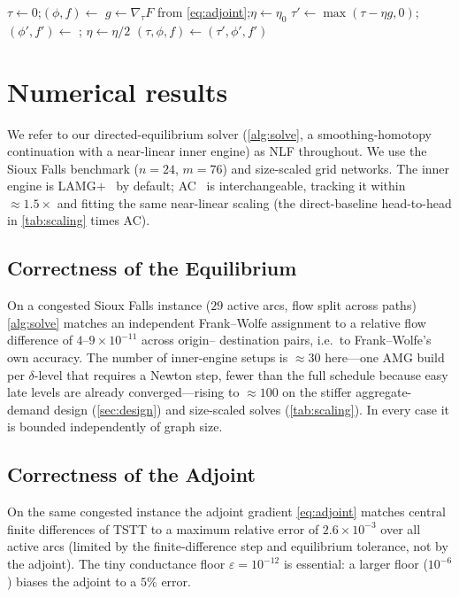 \documentclass[ijoc]{informs3}
\begin{document}
\begin{algorithm}
\caption{Bilevel toll design}\label{alg:design}
\begin{algorithmic}[1]
\State $\tau\gets0$;\quad $(\phi,f)\gets$  
  \State $g\gets\nabla_\tau F$ from \cref{eq:adjoint};\quad $\eta\gets\eta_0$
  \Repeat {}
    \State $\tau'\gets\max(\tau-\eta g,0)$; $(\phi',f')\gets$ ; $\eta\gets\eta/2$
  \State $(\tau,\phi,f)\gets(\tau',\phi',f')$
\EndFor
\end{algorithmic}
\end{algorithm}

\section{Numerical results}\label{sec:results}
We refer to our directed-equilibrium solver (\cref{alg:solve}, a smoothing-homotopy continuation with a near-linear inner engine) as NLF throughout.
We use the Sioux Falls benchmark ($n=24$, $m=76$) and size-scaled grid networks. The inner engine is
LAMG$+$~\citep{lamgplus} by default; AC~\citep{kyngsachdeva2016} is interchangeable, tracking it within
${\approx}1.5\times$ and fitting the same near-linear scaling (the direct-baseline head-to-head in
\cref{tab:scaling} times AC).

\subsection{Correctness of the Equilibrium}
On a congested Sioux Falls instance ($29$ active arcs, flow split across paths) \cref{alg:solve} matches an
independent Frank--Wolfe assignment to a relative flow difference of $4$--$9\times10^{-11}$ across origin--
destination pairs, i.e.\ to Frank--Wolfe's own accuracy. The number of inner-engine setups is ${\approx}30$
here---one AMG build per $\delta$-level that requires a Newton step, fewer than the full schedule because easy
late levels are already converged---rising to ${\approx}100$ on the stiffer aggregate-demand design (\cref{sec:design})
and size-scaled solves (\cref{tab:scaling}). In every case it is bounded independently of graph size.

\subsection{Correctness of the Adjoint}
On the same congested instance the adjoint gradient \cref{eq:adjoint} matches central finite differences of TSTT
to a maximum relative error of $2.6\times10^{-3}$ over all active arcs (limited by the finite-difference step and
equilibrium tolerance, not by the adjoint). The tiny conductance floor $\varepsilon=10^{-12}$ is essential: a
larger floor ($10^{-6}$) biases the adjoint to a $5\%$ error.
\end{document}
